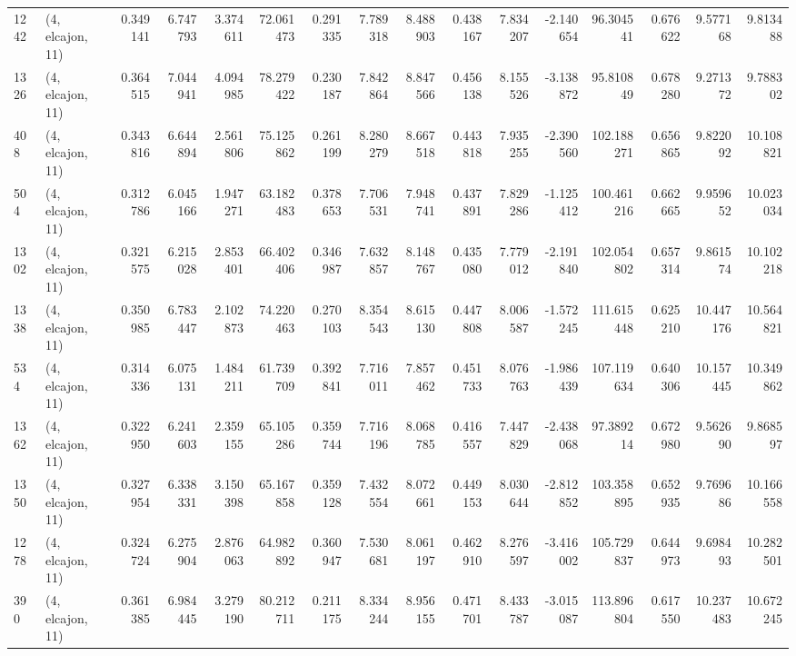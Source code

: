 \begin{tabular}{llrrrrrrrrrrrrrr}
1242 &  (4, elcajon, 11) &   0.349141 &   6.747793 &   3.374611 &     72.061473 &    0.291335 &    7.789318 &    8.488903 &  0.438167 &   7.834207 &  -2.140654 &    96.304541 &   0.676622 &   9.577168 &   9.813488 \\
1326 &  (4, elcajon, 11) &   0.364515 &   7.044941 &   4.094985 &     78.279422 &    0.230187 &    7.842864 &    8.847566 &  0.456138 &   8.155526 &  -3.138872 &    95.810849 &   0.678280 &   9.271372 &   9.788302 \\
408  &  (4, elcajon, 11) &   0.343816 &   6.644894 &   2.561806 &     75.125862 &    0.261199 &    8.280279 &    8.667518 &  0.443818 &   7.935255 &  -2.390560 &   102.188271 &   0.656865 &   9.822092 &  10.108821 \\
504  &  (4, elcajon, 11) &   0.312786 &   6.045166 &   1.947271 &     63.182483 &    0.378653 &    7.706531 &    7.948741 &  0.437891 &   7.829286 &  -1.125412 &   100.461216 &   0.662665 &   9.959652 &  10.023034 \\
1302 &  (4, elcajon, 11) &   0.321575 &   6.215028 &   2.853401 &     66.402406 &    0.346987 &    7.632857 &    8.148767 &  0.435080 &   7.779012 &  -2.191840 &   102.054802 &   0.657314 &   9.861574 &  10.102218 \\
1338 &  (4, elcajon, 11) &   0.350985 &   6.783447 &   2.102873 &     74.220463 &    0.270103 &    8.354543 &    8.615130 &  0.447808 &   8.006587 &  -1.572245 &   111.615448 &   0.625210 &  10.447176 &  10.564821 \\
534  &  (4, elcajon, 11) &   0.314336 &   6.075131 &   1.484211 &     61.739709 &    0.392841 &    7.716011 &    7.857462 &  0.451733 &   8.076763 &  -1.986439 &   107.119634 &   0.640306 &  10.157445 &  10.349862 \\
1362 &  (4, elcajon, 11) &   0.322950 &   6.241603 &   2.359155 &     65.105286 &    0.359744 &    7.716196 &    8.068785 &  0.416557 &   7.447829 &  -2.438068 &    97.389214 &   0.672980 &   9.562690 &   9.868597 \\
1350 &  (4, elcajon, 11) &   0.327954 &   6.338331 &   3.150398 &     65.167858 &    0.359128 &    7.432554 &    8.072661 &  0.449153 &   8.030644 &  -2.812852 &   103.358895 &   0.652935 &   9.769686 &  10.166558 \\
1278 &  (4, elcajon, 11) &   0.324724 &   6.275904 &   2.876063 &     64.982892 &    0.360947 &    7.530681 &    8.061197 &  0.462910 &   8.276597 &  -3.416002 &   105.729837 &   0.644973 &   9.698493 &  10.282501 \\
390  &  (4, elcajon, 11) &   0.361385 &   6.984445 &   3.279190 &     80.212711 &    0.211175 &    8.334244 &    8.956155 &  0.471701 &   8.433787 &  -3.015087 &   113.896804 &   0.617550 &  10.237483 &  10.672245 \\

\end{tabular}
